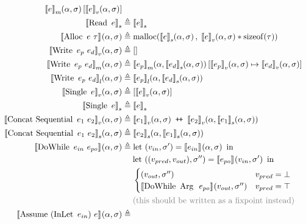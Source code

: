 \begin{align*}
  \denotefsub{m}{e}{\targ,\tmem}[\denotefv{e}{\targ,\tmem}]\\
%
\denotestate{\uop{Read}{e}} &\eqdef \denotestate{e}\\
%
\denotef{\bop{Alloc}{e}{\tau}}{\targ,\tmem} &\eqdef \operatorname{malloc}(\denotefs{e}{\targ,\tmem},\; \denotefv{e}{\targ,\tmem} * \operatorname{sizeof}(\tau))\\
%
\denotefv{\bop{Write}{e_p}{e_d}}{\targ,\tmem} &\eqdef []\\
%
\denotefsub{m}{\bop{Write}{e_p}{e_d}}{\targ,\tmem} &\eqdef
\denotefsub{m}{e_p}{\targ,\denotefs{e_d}{\targ,\tmem}}[\denotefv{e_p}{\targ,\tmem} \mapsto \denotefv{e_d}{\targ,\tmem}]\\
%
\denotefsub{l}{\bop{Write}{e_p}{e_d}}{\targ,\tmem} &\eqdef
\denotefsub{l}{e_p}{\targ,\denotefs{e_d}{\targ,\tmem}}\\
%
\denotefv{\uop{Single}e}{\targ,\tmem} &\eqdef [\denotefv{e}{\targ,\tmem}]\\
\denotestate{\uop{Single}e} &\eqdef \denotestate{e} \\
%
\denotefv{\bop{Concat\ Sequential}{e_1}{e_2}}{\targ,\tmem} &\eqdef
\append{\denotefv{e_1}{\targ,\tmem}}{\denotefv{e_2}{\targ,\denotefs{e_1}{\targ,\tmem}}}\\
%
\denotefs{\bop{Concat\ Sequential}{e_1}{e_2}}{\targ,\tmem} &\eqdef
\denotefs{e_2}{\targ,\denotefs{e_1}{\targ,\tmem}}\\
%
\denotef{\bop{DoWhile}{e_{in}}{e_{po}}}{\targ,\tmem} &\eqdef
\mathrm{let}\ (v_{in},\tmem') = \denotef{e_{in}}{\targ,\tmem}\ \mathrm{in}\\
&\hspace{1.3em}\mathrm{let}\ ((v_{pred}, v_{out}), \tmem'') = \denotef{e_{po}}{v_{in},\tmem'}\ \mathrm{in}\\
&\hspace{1.3em}\begin{cases}
   (v_{out}, \tmem'')
   & v_{pred} = \bot\\
   \denotef{\bop{DoWhile}{\mathrm{Arg}\ }{e_{po}}}{v_{out},\tmem''}
   & v_{pred} = \top\\
\end{cases}\\
&\hspace{1.3em}\text{\color{gray}(this should be written as a fixpoint instead)}\\
\denotef{\bop{Assume}{(\uop{InLet}{e_{in}})}{e}}{\targ,\tmem} &\eqdef

\end{align*}
